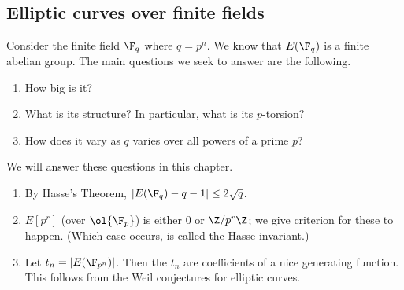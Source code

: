 \subsection{Elliptic curves over finite fields}
Consider the finite field $\F_q$ where $q=p^n$. 
We know that $E(\F_q)$ is a finite abelian group. The main questions we seek to answer are the following.
\begin{enumerate}
\item
How big is it?
\item
What is its structure? In particular, what is its $p$-torsion?
\item
How does it vary as $q$ varies over all powers of a prime $p$?
\end{enumerate}
We will answer these questions in this chapter.
\begin{enumerate}
\item
By Hasse's Theorem, $|E(\F_q)-q-1|\le 2\sqrt q$.
\item
$E[p^r]$ (over $\ol{\F_p}$) is either 0 or $\Z/p^r\Z$; we give criterion for these to happen. (Which case occurs, is called the Hasse invariant.)
\item
Let $t_n=|E(\F_{p^n})|$. Then the $t_n$ are coefficients of a nice generating function. This follows from the Weil conjectures for elliptic curves.
\end{enumerate}
